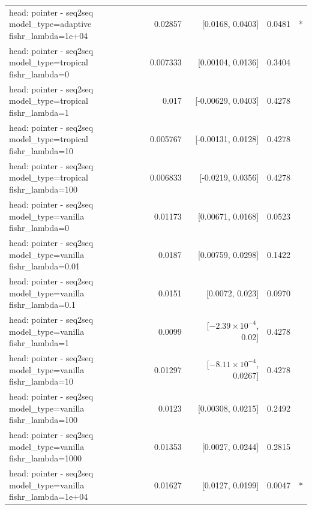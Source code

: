 \documentclass[10pt]{article}
\makeatletter
\newcommand{\stackcell}[1]{\begin{tabular}[t]{@{}l@{}}#1\end{tabular}}
\makeatother
\begin{document}
{\begin{longtable}{lrrrl}
\stackcell{head: pointer - seq2seq\\\footnotesize model\_type=adaptive fishr\_lambda=1e+04 } & 0.02857 & [0.0168, 0.0403] & 0.0481 & *\\
\stackcell{head: pointer - seq2seq\\\footnotesize model\_type=tropical fishr\_lambda=0 } & 0.007333 & [0.00104, 0.0136] & 0.3404 & \\
\stackcell{head: pointer - seq2seq\\\footnotesize model\_type=tropical fishr\_lambda=1 } & 0.017 & [-0.00629, 0.0403] & 0.4278 & \\
\stackcell{head: pointer - seq2seq\\\footnotesize model\_type=tropical fishr\_lambda=10 } & 0.005767 & [-0.00131, 0.0128] & 0.4278 & \\
\stackcell{head: pointer - seq2seq\\\footnotesize model\_type=tropical fishr\_lambda=100 } & 0.006833 & [-0.0219, 0.0356] & 0.4278 & \\
\stackcell{head: pointer - seq2seq\\\footnotesize model\_type=vanilla fishr\_lambda=0 } & 0.01173 & [0.00671, 0.0168] & 0.0523 & \\
\stackcell{head: pointer - seq2seq\\\footnotesize model\_type=vanilla fishr\_lambda=0.01 } & 0.0187 & [0.00759, 0.0298] & 0.1422 & \\
\stackcell{head: pointer - seq2seq\\\footnotesize model\_type=vanilla fishr\_lambda=0.1 } & 0.0151 & [0.0072, 0.023] & 0.0970 & \\
\stackcell{head: pointer - seq2seq\\\footnotesize model\_type=vanilla fishr\_lambda=1 } & 0.0099 & [$-2.39\times10^{-4}$, 0.02] & 0.4278 & \\
\stackcell{head: pointer - seq2seq\\\footnotesize model\_type=vanilla fishr\_lambda=10 } & 0.01297 & [$-8.11\times10^{-4}$, 0.0267] & 0.4278 & \\
\stackcell{head: pointer - seq2seq\\\footnotesize model\_type=vanilla fishr\_lambda=100 } & 0.0123 & [0.00308, 0.0215] & 0.2492 & \\
\stackcell{head: pointer - seq2seq\\\footnotesize model\_type=vanilla fishr\_lambda=1000 } & 0.01353 & [0.0027, 0.0244] & 0.2815 & \\
\stackcell{head: pointer - seq2seq\\\footnotesize model\_type=vanilla fishr\_lambda=1e+04 } & 0.01627 & [0.0127, 0.0199] & 0.0047 & *\\
\bottomrule
\end{longtable}
}
\end{document}
